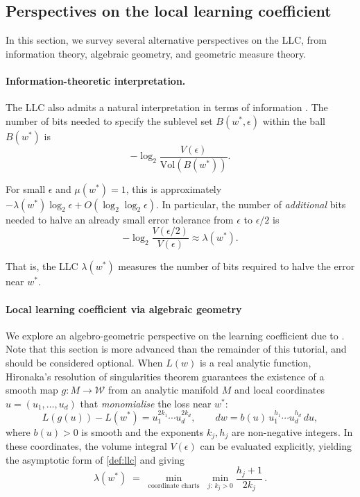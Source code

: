 \documentclass[11pt]{article}
\begin{document}
\subsection{Perspectives on the local learning coefficient}

In this section, we survey several alternative perspectives on the LLC, from information theory, algebraic geometry, and geometric measure theory.

\paragraph{Information-theoretic interpretation.}

The LLC also admits a natural interpretation in terms of information \citep{Lau+2025}. The number of bits needed to specify the sublevel set $B(w^*, \epsilon)$ within the ball $B(w^*)$ is
\begin{equation}
    -\log_2 \frac{V(\epsilon)}{\mathrm{Vol}(B(w^*))}.
\end{equation}

For small $\epsilon$ and $\mu(w^*) = 1$, this is approximately $-\lambda(w^*) \log_2 \epsilon + O(\log_2 \log_2 \epsilon)$. In particular, the number of \emph{additional} bits needed to halve an already small error tolerance from $\epsilon$ to $\epsilon/2$ is
\begin{equation}
    -\log_2 \frac{V(\epsilon / 2)}{V(\epsilon)} \approx \lambda(w^*).
\end{equation}

That is, the LLC $\lambda(w^*)$ measures the number of bits required to halve the error near $w^*$. 

\paragraph{Local learning coefficient via algebraic geometry}
\label{par:rlct}

We explore an algebro-geometric perspective on the learning coefficient due to \citet{Watanabe2009}.
Note that this section is more advanced than the remainder of this tutorial, and should be considered optional.
When $L(w)$ is a real analytic function, Hironaka's resolution of
singularities theorem guarantees the existence of a smooth map
$g \colon M \to \mathcal{W}$ from an analytic manifold $M$ and local coordinates
$u = (u_1, \ldots, u_d)$ that \emph{monomialise} the loss near $w^*$:
\begin{equation*}
    L(g(u)) - L(w^*) = u_1^{2k_1} \cdots u_d^{2k_d},
    \qquad
    dw = b(u)\, u_1^{h_1} \cdots u_d^{h_d}\, du,
\end{equation*}
where $b(u) > 0$ is smooth and the exponents $k_j, h_j$ are
non-negative integers.
In these coordinates, the volume integral $V(\epsilon)$ can be
evaluated explicitly, yielding the asymptotic form of
\cref{def:llc} and giving
\begin{equation}\label{eq:rlct}
    \lambda(w^*) \;=\; \min_{\text{coordinate charts}}\; \min_{j:\, k_j > 0}
    \frac{h_j + 1}{2k_j}\,.
\end{equation}
\end{document}

